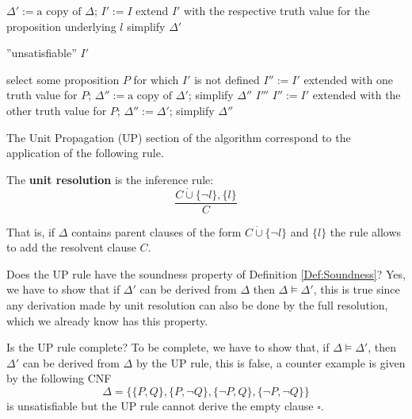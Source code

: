 \documentclass[10pt, letterpaper]{report}
\begin{document}
\begin{algorithm}
\caption{Davis-Putnam-Logemann-Loveland (DPLL)}
\begin{algorithmic}[1]
    \State {}
    \State $\Delta' := \text{a copy of } \Delta$; $I' := I$
        \State extend $I'$ with the respective truth value for the proposition underlying $l$
        \State {}
        \State simplify $\Delta'$ 
    \EndWhile

    \State {}
        \State \Return ''unsatisfiable''
    \EndIf
        \State \Return $I'$
    \EndIf

    \State {}
    \State select some proposition $P$ for which $I'$ is not defined
    \State $I'' := I'$ extended with one truth value for $P$; $\Delta'' := \text{a copy of } \Delta'$; simplify $\Delta''$
        \State \Return $I'''$
    \EndIf
    \State $I'' := I'$ extended with the other truth value for $P$; $\Delta'' := \Delta'$; simplify $\Delta''$
    \State \Return {}
\EndFunction
\end{algorithmic}
\end{algorithm}
The Unit Propagation (UP) section of the algorithm correspond to the application of the following rule.\begin{definition}
    The \textbf{unit resolution} is the inference rule:\begin{equation}
        \frac{C\dot\cup\{\lnot l\},\{l\}}{C}
    \end{equation}
\end{definition}
That is, if $\Delta$ contains parent clauses of the form $C\dot\cup\{\lnot l\}$ and $\{l\}$ the rule
 allows to add the resolvent clause $C$.

 Does the UP rule have the soundness property of Definition \ref{Def:Soundness}? Yes, we have to show that if $\Delta'$ can be derived from $\Delta$ then $\Delta\models \Delta'$, this is true since any derivation made by unit resolution can also be done by the full resolution, which we already know has this property.

 Is the UP rule complete? To be complete, we have to show that, if $\Delta\models\Delta'$, then $\Delta'$ can be derived from $\Delta$ by the UP rule, this is false, a counter example is given by the following CNF$$\Delta = 
  \{\{P,Q\}, \{P,\lnot Q\}, \{\lnot P,Q\}, \{\lnot P,\lnot Q\}\}
 $$
 is unsatisfiable but the UP rule cannot derive the empty clause $\square$.\bigskip 
\end{document}
